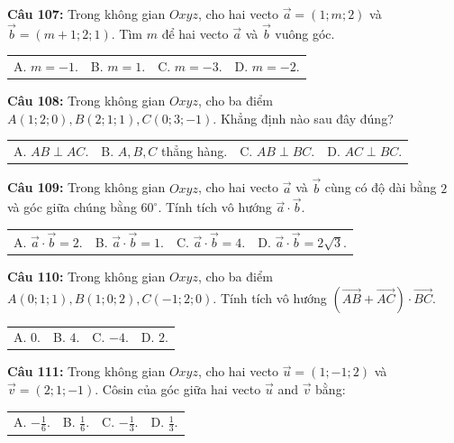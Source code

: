 \documentclass[12pt]{article}
\begin{document}
	\vspace{2mm}
	\noindent \textbf{Câu 107:} Trong không gian $Oxyz$, cho hai vecto $\vec{a} = (1; m; 2)$ và $\vec{b} = (m+1; 2; 1)$. Tìm $m$ để hai vecto $\vec{a}$ và $\vec{b}$ vuông góc. \\
	\noindent
	\begin{tabular}{p{} p{} p{} p{}}
		A. $m = -1$. & B. $m = 1$. & C. $m = -3$. & D. $m = -2$.
	\end{tabular}
	
	\vspace{2mm}
	\noindent \textbf{Câu 108:} Trong không gian $Oxyz$, cho ba điểm $A(1; 2; 0), B(2; 1; 1), C(0; 3; -1)$. Khẳng định nào sau đây đúng? \\
	\noindent
	\begin{tabular}{p{} p{} p{} p{}}
		A. $AB \perp AC$. & B. $A, B, C$ thẳng hàng. & C. $AB \perp BC$. & D. $AC \perp BC$.
	\end{tabular}
	
	\vspace{2mm}
	\noindent \textbf{Câu 109:} Trong không gian $Oxyz$, cho hai vecto $\vec{a}$ và $\vec{b}$ cùng có độ dài bằng $2$ và góc giữa chúng bằng $60^\circ$. Tính tích vô hướng $\vec{a} \cdot \vec{b}$. \\
	\noindent
	\begin{tabular}{p{} p{} p{} p{}}
		A. $\vec{a} \cdot \vec{b} = 2$. & B. $\vec{a} \cdot \vec{b} = 1$. & C. $\vec{a} \cdot \vec{b} = 4$. & D. $\vec{a} \cdot \vec{b} = 2\sqrt{3}$.
	\end{tabular}
	
	\vspace{2mm}
	\noindent \textbf{Câu 110:} Trong không gian $Oxyz$, cho ba điểm $A(0; 1; 1), B(1; 0; 2), C(-1; 2; 0)$. Tính tích vô hướng $(\vec{AB} + \vec{AC}) \cdot \vec{BC}$. \\
	\noindent
	\begin{tabular}{p{} p{} p{} p{}}
		A. $0$. & B. $4$. & C. $-4$. & D. $2$.
	\end{tabular}
	
	\vspace{2mm}
	\noindent \textbf{Câu 111:} Trong không gian $Oxyz$, cho hai vecto $\vec{u} = (1; -1; 2)$ và $\vec{v} = (2; 1; -1)$. Côsin của góc giữa hai vecto $\vec{u}$ and $\vec{v}$ bằng: \\
	\noindent
	\begin{tabular}{p{} p{} p{} p{}}
		A. $-\frac{1}{6}$. & B. $\frac{1}{6}$. & C. $-\frac{1}{3}$. & D. $\frac{1}{3}$.
	\end{tabular}
	
\end{document}
